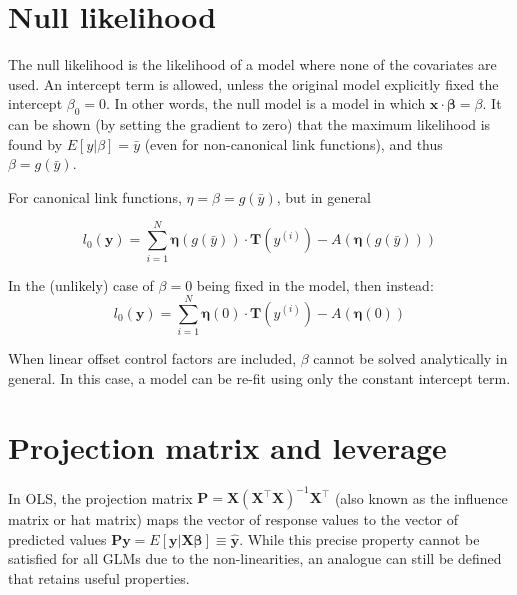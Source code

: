 \documentclass{article}
\newcommand{\bbeta}{\boldsymbol{\beta}}
\begin{document}
\section{Null likelihood}

The null likelihood is the likelihood of a model where none of the covariates
are used. An intercept term is allowed, unless the original model explicitly
fixed the intercept \(\beta_0 = 0\). In other words, the null model is a
model in which \(\mathbf{x}\cdot\bbeta = \beta\). It can be shown
(by setting the gradient to zero) that the maximum likelihood is found by
\(E[y|\beta] = \bar{y}\) (even for non-canonical link functions), and thus
\(\beta = g(\bar{y})\).

For canonical link functions, \(\eta = \beta = g(\bar{y})\), but in general

\[l_{0}(\mathbf{y}) = \sum_{i=1}^N \boldsymbol{\eta}(g(\bar{y})) \cdot
\mathbf{T}(y^{(i)}) - A\left(\boldsymbol{\eta}(g(\bar{y})) \right)\]

In the (unlikely) case of \(\beta = 0\) being fixed in the model, then instead:
\[l_{0}(\mathbf{y}) = \sum_{i=1}^N \boldsymbol{\eta}(0) \cdot
\mathbf{T}(y^{(i)}) - A\left(\boldsymbol{\eta}(0) \right)\]

When linear offset control factors are included, \(\beta\) cannot be solved
analytically in general. In this case, a model can be re-fit using only the
constant intercept term.

\section{Projection matrix and leverage}

In OLS, the projection matrix \(\mathbf{P} =
\mathbf{X}\left(\mathbf{X}^{\intercal}\mathbf{X}\right)^{-1}\mathbf{X}^{\intercal}\)
(also known as the influence matrix or hat matrix) maps the vector of response
values to the vector of predicted values \(\mathbf{P}\mathbf{y} =
E[\mathbf{y}|\mathbf{X}\bbeta] \equiv \hat{\mathbf{y}}\). While
this precise property cannot be satisfied for all GLMs due to the
non-linearities, an analogue can still be defined that retains useful
properties.
\end{document}
